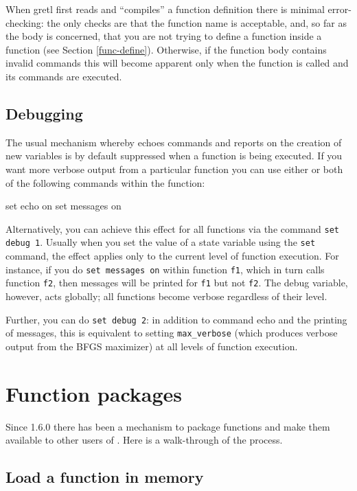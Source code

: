 When gretl first reads and ``compiles'' a function definition there is
minimal error-checking: the only checks are that the function name is
acceptable, and, so far as the body is concerned, that you are not
trying to define a function inside a function (see Section
\ref{func-define}). Otherwise, if the function body contains invalid
commands this will become apparent only when the function is called
and its commands are executed.

\subsection{Debugging}

The usual mechanism whereby  echoes commands and reports on
the creation of new variables is by default suppressed when a function
is being executed.  If you want more verbose output from a particular
function you can use either or both of the following commands within
the function:
%
\begin{code}
set echo on
set messages on
\end{code}

Alternatively, you can achieve this effect for all functions via
the command \texttt{set debug 1}.  Usually when you set the value of a
state variable using the \texttt{set} command, the effect applies only
to the current level of function execution.  For instance, if you do
\texttt{set messages on} within function \texttt{f1}, which in turn
calls function \texttt{f2}, then messages will be printed for
\texttt{f1} but not \texttt{f2}.  The debug variable, however, acts
globally; all functions become verbose regardless of their level.

Further, you can do \texttt{set debug 2}: in addition to command echo
and the printing of messages, this is equivalent to setting
\verb|max_verbose| (which produces verbose output from the BFGS
maximizer) at all levels of function execution.

\section{Function packages}
\label{sec:func-packages}

Since  1.6.0 there has been a mechanism to package
functions and make them available to other users of .  Here
is a walk-through of the process.

\subsection{Load a function in memory}

